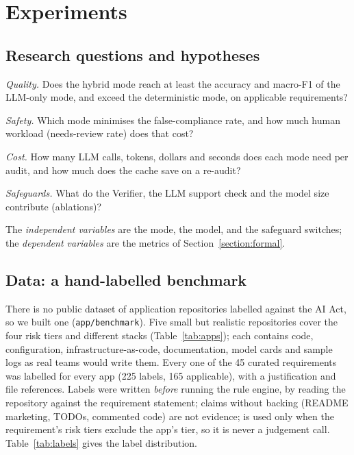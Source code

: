\chapter{Experiments}
\label{chapter:experiments}

\section{Research questions and hypotheses}
\label{section:hypotheses}

\begin{description}[leftmargin=1.2cm, labelwidth=1cm]
  \item[RQ1] \emph{Quality.} Does the hybrid mode reach at least the accuracy and macro-F1 of the LLM-only mode, and
        exceed the deterministic mode, on applicable requirements?
  \item[RQ2] \emph{Safety.} Which mode minimises the false-compliance rate, and how much human workload (needs-review
        rate) does that cost?
  \item[RQ3] \emph{Cost.} How many LLM calls, tokens, dollars and seconds does each mode need per audit, and how much does
        the cache save on a re-audit?
  \item[RQ4] \emph{Safeguards.} What do the Verifier, the LLM support check and the model size contribute (ablations)?
\end{description}
\noindent The \emph{independent variables} are the mode, the model, and the safeguard switches; the \emph{dependent
variables} are the metrics of Section~\ref{section:formal}.

\section{Data: a hand-labelled benchmark}
\label{section:data}

There is no public dataset of application repositories labelled against the AI Act, so we built one
(\texttt{app/benchmark}). Five small but realistic repositories cover the four risk tiers and different stacks
(Table~\ref{tab:apps}); each contains code, configuration, infrastructure-as-code, documentation, model cards and sample
logs as real teams would write them. Every one of the 45 curated requirements was labelled for every app (225 labels,
165 applicable), with a justification and file references. Labels were written \emph{before} running the rule engine, by
reading the repository against the requirement statement; claims without backing (README marketing, TODOs, commented code)
are not evidence;  is used only when the requirement's risk tiers exclude the app's tier, so it is never a
judgement call. Table~\ref{tab:labels} gives the label distribution.

